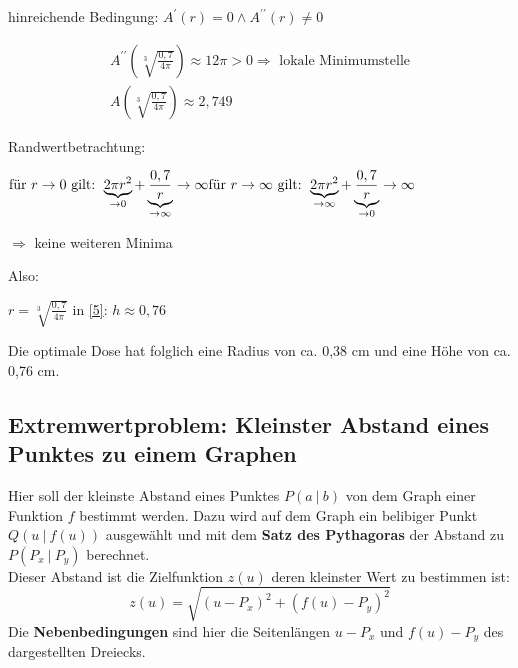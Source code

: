 hinreichende Bedingung: $A^\prime(r) = 0 \land A^{\prime\prime}(r) \neq 0$

\begin{equation*}
    \begin{gathered}
        A^{\prime\prime}\left(\sqrt[3]{\frac{0,7}{4\pi}}\right) \approx 12\pi > 0 \Rightarrow \text{ lokale Minimumstelle} \\
        A\left(\sqrt[3]{\frac{0,7}{4\pi}}\right) \approx 2,749
    \end{gathered}
\end{equation*}

Randwertbetrachtung: 

$\text{für }  r \to 0  \text{ gilt: }  \underbrace{2\pi r^2}_{\to 0} + \underbrace{\frac{0,7}{r}}_{\to \infty} \to \infty \\
\text{für }  r \to \infty \text{ gilt: }  \underbrace{2\pi r^2}_{\to \infty} + \underbrace{\frac{0,7}{r}}_{\to 0} \to \infty$

$\Rightarrow$ keine weiteren Minima

Also: 

$r = \sqrt[3]{\frac{0,7}{4\pi}}$ in \eqref{5}: $ h \approx 0, 76 $

Die \glqq optimale\grqq{} Dose hat folglich eine Radius von ca. 0,38 cm und eine Höhe von ca. 0,76 cm.

\subsection{Extremwertproblem: Kleinster Abstand eines Punktes zu einem Graphen}

Hier soll der kleinste Abstand eines Punktes $P(a \ |  \ b)$ von dem Graph einer Funktion $f$ bestimmt werden. Dazu wird auf dem Graph ein belibiger Punkt $Q(u \ | \ f(u))$ ausgewählt und mit dem \textbf{Satz des Pythagoras} der Abstand zu $P(P_x \ |  \ P_y)$ berechnet.\\
Dieser Abstand ist die Zielfunktion $z(u)$ deren kleinster Wert zu bestimmen ist:
$$z(u) = \sqrt{(u-P_x)^2 + (f(u)-P_y)^2}$$
Die \textbf{Nebenbedingungen} sind hier die Seitenlängen $u - P_x$ und $f(u) - P_y$ des dargestellten Dreiecks.

